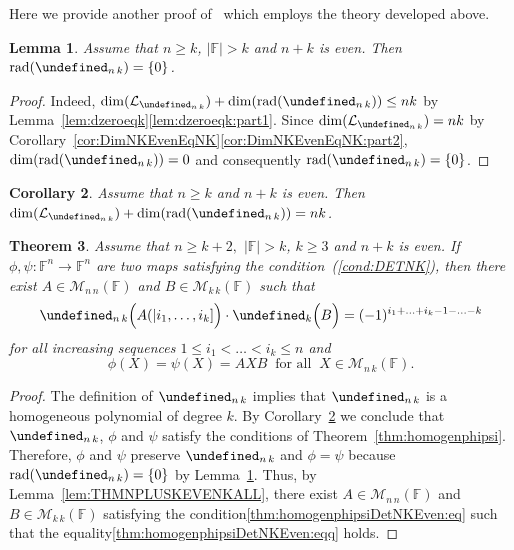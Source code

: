 \documentclass{elsarticle}
\let\det\undefined
\DeclareMathOperator{\det}{det}
\DeclareMathOperator{\rad}{rad}
\def\F{{\mathbb F}}
\def\L{{\mathcal L}}
\def\M{{\mathcal M}}
\newtheorem{theorem}{Theorem}[section]
\newtheorem{lemma}[theorem]{Lemma}
\newtheorem{corollary}[theorem]{Corollary}
\theoremstyle{definition}
\newtheorem{remark}[theorem]{Remark}
\numberwithin{equation}{section}
\begin{document}
Here we provide another proof of~\cite[Lemma~4.6]{Guterman2025} which employs the theory developed above.

\begin{lemma}\label{lem:NKEvenAdditionPreserverIsZero}Assume that $n \ge k$, $|\F| > k$ and $n + k$ is even. Then\linebreak $\rad(\det_{n\,k}) = \{0\}$.
\end{lemma}
\begin{proof}Indeed, $\dim(\L_{\det_{n\,k}}) + \dim(\rad(\det_{n\,k})) \le nk$ by Lemma~\ref{lem:dzeroeqk}\ref{lem:dzeroeqk:part1}. Since $\dim(\L_{\det_{n\,k}}) = nk$ by Corollary~\ref{cor:DimNKEvenEqNK}\ref{cor:DimNKEvenEqNK:part2}, $\dim(\rad(\det_{n\,k})) = 0$ and consequently $\rad(\det_{n\,k}) = \{0\}$.
\end{proof}


\begin{corollary}\label{cor:NKEvenSatDimCond}Assume that  $n \ge k$   and  $n + k$ is even. Then $\dim(\L_{\det_{n\,k}}) + \dim(\rad(\det_{n\,k})) = nk$.
\end{corollary}
%

\begin{theorem}\label{thm:homogenphipsiDetNKEven}Assume that  $n \ge k + 2,$ $|\F| > k$, $k \ge 3$ and  $n + k$ is even.  If  $\phi, \psi \colon \F^n \to \F^n$ are two maps satisfying the condition~(\ref{cond:DETNK}), then there exist  $A \in \M_{n\, n}(\F)$ and $B \in \M_{k\, k}(\F)$ such that
\begin{equation}\label{thm:homogenphipsiDetNKEven:eq}
\det_{n\, k} \Bigl(A(|i_1,\ldots, i_k]\Bigr) \cdot \det_k \Bigl(B\Bigr) = (-1)^{i_1 + \ldots + i_k - 1 - \ldots - k}
\end{equation}
for all increasing sequences $1 \le i_1 < \ldots < i_k \le n $ and
\begin{equation}\label{thm:homogenphipsiDetNKEven:eqq}
\phi(X) = \psi(X) = AXB\;\;\mbox{for all}\;\;X \in \M_{n\, k} (\F).
\end{equation}
\end{theorem} 
\begin{proof}The definition of $\det_{n\,k}$ implies that $\det_{n\,k}$ is a homogeneous polynomial of degree $k$. By Corollary~\ref{cor:NKEvenSatDimCond} we conclude that $\det_{n\,k}$, $\phi$ and $\psi$ satisfy the conditions of Theorem~\ref{thm:homogenphipsi}. Therefore, $\phi$ and $\psi$ preserve $\det_{n\,k}$ and $\phi = \psi$ because $\rad(\det_{n\,k}) = \{0\}$ by Lemma~\ref{lem:NKEvenAdditionPreserverIsZero}.
Thus, by Lemma~\ref{lem:THMNPLUSKEVENKALL}, there exist  $A \in \M_{n\, n}(\F)$ and $B \in \M_{k\, k}(\F)$ satisfying the condition\eqref{thm:homogenphipsiDetNKEven:eq} such that the equality\eqref{thm:homogenphipsiDetNKEven:eqq} holds.
\end{proof}
\end{document}
